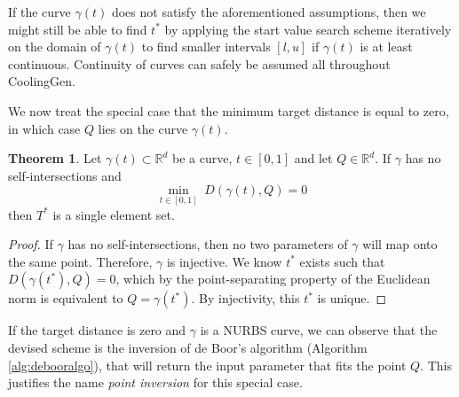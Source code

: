 \documentclass[a4paper, 11pt]{report}
\theoremstyle{definition}
\newtheorem{theorem}[definition]{Theorem}
\renewcommand{\emph}[1]{\textit{#1}}
\begin{document}
	If the curve $\gamma(t)$ does not satisfy the aforementioned assumptions, then we might still be able to find $t^*$ by applying the start value search scheme iteratively on the domain of $\gamma(t)$ to find smaller intervals $[l,u]$ if $\gamma(t)$ is at least continuous. Continuity of curves can safely be assumed all throughout CoolingGen.

	We now treat the special case that the minimum target distance is equal to zero, in which case $Q$ lies on the curve $\gamma(t)$.
	\begin{theorem}
		Let $\gamma(t) \subset \mathbb{R}^d$ be a curve, $t \in [0,1]$ and let $Q \in \mathbb{R}^d$. If $\gamma$ has no self-intersections and
			$$\underset{t\in[0,1]}{\min} \; D(\gamma(t), Q) = 0$$
		then $T^*$ is a single element set.
	\end{theorem}
	\begin{proof}
		If $\gamma$ has no self-intersections, then no two parameters of $\gamma$ will map onto the same point. Therefore, $\gamma$ is injective. We know $t^*$ exists such that $D(\gamma(t^*), Q) = 0$, which by the point-separating property of the Euclidean norm is equivalent to $Q = \gamma(t^*)$. By injectivity, this $t^*$ is unique.
	\end{proof}

	If the target distance is zero and $\gamma$ is a NURBS curve, we can observe that the devised scheme is the inversion of de Boor's algorithm (Algorithm \ref{alg:debooralgo}), that will return the input parameter that fits the point $Q$. This justifies the name \emph{point inversion} for this special case.
\end{document}
